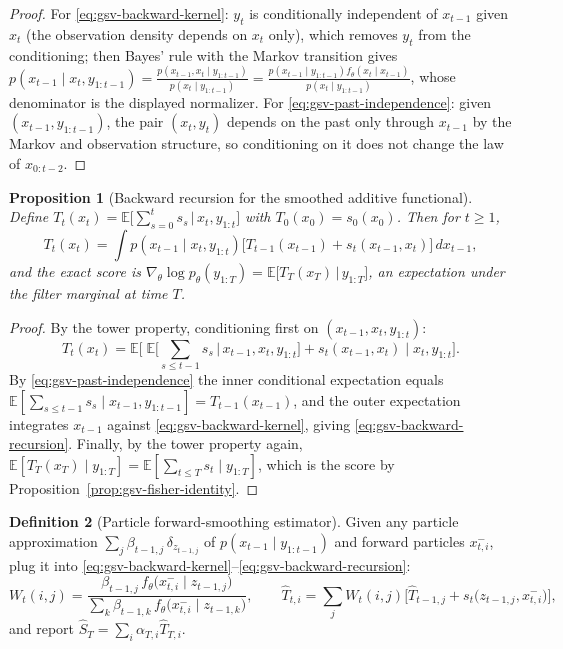 \documentclass[11pt]{article}
\newtheorem{proposition}{Proposition}[section]
\theoremstyle{definition}
\newtheorem{definition}[proposition]{Definition}
\theoremstyle{remark}
\begin{document}
\begin{proof}
For \eqref{eq:gsv-backward-kernel}: $y_t$ is conditionally independent of
$x_{t-1}$ given $x_t$ (the observation density depends on $x_t$ only), which
removes $y_t$ from the conditioning; then Bayes' rule with the Markov
transition gives
$p(x_{t-1}\mid x_t,y_{1:t-1})
=\frac{p(x_{t-1},x_t\mid y_{1:t-1})}{p(x_t\mid y_{1:t-1})}
=\frac{p(x_{t-1}\mid y_{1:t-1})f_\theta(x_t\mid x_{t-1})}
       {p(x_t\mid y_{1:t-1})}$,
whose denominator is the displayed normalizer.  For
\eqref{eq:gsv-past-independence}: given $(x_{t-1},y_{1:t-1})$, the pair
$(x_t,y_t)$ depends on the past only through $x_{t-1}$ by the Markov and
observation structure, so conditioning on it does not change the law of
$x_{0:t-2}$.
\end{proof}

\begin{proposition}[Backward recursion for the smoothed additive functional]
\label{prop:gsv-backward-recursion}
Define $T_t(x_t)=\mathbb{E}\big[\sum_{s=0}^{t}s_s\,\big|\,x_t,y_{1:t}\big]$
with $T_0(x_0)=s_0(x_0)$.  Then for $t\ge1$,
\begin{equation}
\label{eq:gsv-backward-recursion}
 T_t(x_t)
 =\int p(x_{t-1}\mid x_t,y_{1:t})
 \Big[T_{t-1}(x_{t-1})+s_t(x_{t-1},x_t)\Big]\,dx_{t-1},
\end{equation}
and the exact score is
$\nabla_\theta\log p_\theta(y_{1:T})
=\mathbb{E}\big[T_T(x_T)\,\big|\,y_{1:T}\big]$,
an expectation under the filter marginal at time $T$.
\end{proposition}

\begin{proof}
By the tower property, conditioning first on $(x_{t-1},x_t,y_{1:t})$:
\[
 T_t(x_t)
 =\mathbb{E}\Big[\;
 \mathbb{E}\big[\textstyle\sum_{s\le t-1}s_s\,\big|\,x_{t-1},x_t,y_{1:t}\big]
 +s_t(x_{t-1},x_t)
 \;\Big|\;x_t,y_{1:t}\Big].
\]
By \eqref{eq:gsv-past-independence} the inner conditional expectation equals
$\mathbb{E}[\sum_{s\le t-1}s_s\mid x_{t-1},y_{1:t-1}]=T_{t-1}(x_{t-1})$, and
the outer expectation integrates $x_{t-1}$ against
\eqref{eq:gsv-backward-kernel}, giving
\eqref{eq:gsv-backward-recursion}.  Finally, by the tower property again,
$\mathbb{E}[T_T(x_T)\mid y_{1:T}]
=\mathbb{E}[\sum_{t\le T}s_t\mid y_{1:T}]$, which is the score by
Proposition~\ref{prop:gsv-fisher-identity}.
\end{proof}

\begin{definition}[Particle forward-smoothing estimator]
\label{def:gsv-pds}
Given any particle approximation
$\sum_j\beta_{t-1,j}\,\delta_{z_{t-1,j}}$ of $p(x_{t-1}\mid y_{1:t-1})$ and
forward particles $x_{t,i}^{-}$, plug it into
\eqref{eq:gsv-backward-kernel}--\eqref{eq:gsv-backward-recursion}:
\begin{equation}
\label{eq:gsv-pds}
 W_t(i,j)
 =\frac{\beta_{t-1,j}\,f_\theta\!\big(x_{t,i}^{-}\mid z_{t-1,j}\big)}
        {\sum_k\beta_{t-1,k}\,f_\theta\!\big(x_{t,i}^{-}\mid z_{t-1,k}\big)},
 \qquad
 \widehat T_{t,i}
 =\sum_j W_t(i,j)\Big[\widehat T_{t-1,j}
 +s_t\big(z_{t-1,j},x_{t,i}^{-}\big)\Big],
\end{equation}
and report $\widehat S_T=\sum_i\alpha_{T,i}\widehat T_{T,i}$.
\end{definition}
\end{document}
